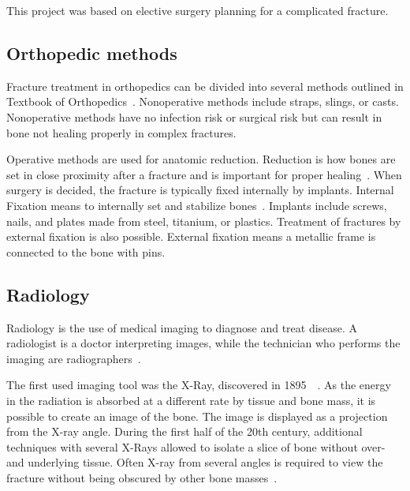 \documentclass[a4paper]{report}
\begin{document}
This project was based on elective surgery planning for a complicated fracture.

\subsection{Orthopedic methods}

Fracture treatment in orthopedics can be divided into several methods outlined in Textbook of Orthopedics~\cite{ebnezar_textbook_2016}.
Nonoperative methods include straps, slings, or casts.
Nonoperative methods have no infection risk or surgical risk but can result in bone not healing properly in complex fractures.

Operative methods are used for anatomic reduction. Reduction is how bones are set in close proximity after a fracture and is important for proper healing~\cite{verywell_health_fracture_nodate}.
When surgery is decided, the fracture is typically fixed internally by implants.
Internal Fixation means to internally set and stabilize bones~\cite{ebnezar_textbook_2016}.
Implants include screws, nails, and plates made from steel, titanium, or plastics.
Treatment of fractures by external fixation is also possible. External fixation means a metallic frame is connected to the bone with pins.

\subsection{Radiology}
Radiology is the use of medical imaging to diagnose and treat disease. A radiologist is a doctor interpreting images, while the technician who performs the imaging are radiographers~\cite{swiontkowski_manual_2013}.

The first used imaging tool was the X-Ray, discovered in 1895~\cite{hamblen_outline_2010}~\cite{suetens_fundamentals_2017}. As the energy in the radiation is absorbed at a different rate by tissue and bone mass, it is possible to create an image of the bone. The image is displayed as a projection from the X-ray angle. During the first half of the 20th century, additional techniques with several X-Rays allowed to isolate a slice of bone without over- and underlying tissue. Often X-ray from several angles is required to view the fracture without being obscured by other bone masses~\cite{ebnezar_textbook_2016}.
\end{document}
